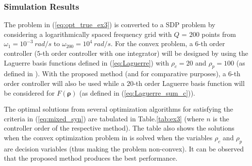 \documentclass[letterpaper, 10 pt, conference]{ieeeconf}  %
\begin{document}
\subsubsection{Simulation Results}
The problem in (\ref{eq:opt_true_ex3}) is converted to a SDP problem by considering a logarithmically spaced frequency grid with $Q$ = $200$ points from $\omega_1 = 10^{-3} \: rad/s$ to $\omega_{200} = 10^{4} \: rad/s$. For the convex problem, a $6$-th order controller ($5$-th order controller with one integrator) will be designed by using the Laguerre basis functions defined in (\ref{eq:Laguerre}) with $\rho_c = 20$ and $\rho_p = 100$ (as defined in \cite{KNZ16}). With the proposed method (and for comparative purposes), a $6$-th order controller will also be used while a $20$-th order Laguerre basis function will be considered for $F(\bm{\rho})$ (as defined in (\ref{eq:Laguerre_sum_c})). 

The optimal solutions from several optimization algorithms for satisfying the criteria in (\ref{eq:mixed_syn}) are tabulated in Table.\ref{tab:ex3} (where $n$ is the controller order of the respective method). The table also shows the solutions when the convex optimization problem in \cite{KNZ16} is solved when the variables $\rho_c$ and $\rho_p$ are decision variables (thus making the problem non-convex). It can be observed that the proposed method produces the best performance. 
\end{document}
